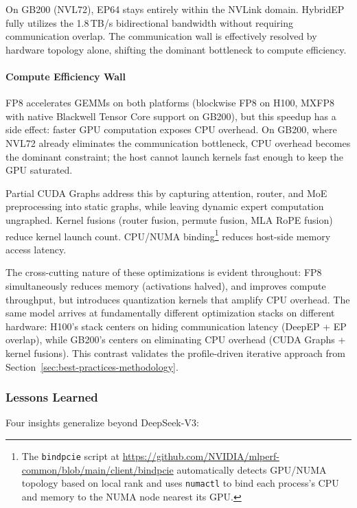 On GB200 (NVL72), EP64 stays entirely within the NVLink domain. HybridEP fully utilizes the 1.8\,TB/s bidirectional bandwidth without requiring communication overlap. The communication wall is effectively resolved by hardware topology alone, shifting the dominant bottleneck to compute efficiency.

\paragraph*{Compute Efficiency Wall}
FP8 accelerates GEMMs on both platforms (blockwise FP8 on H100, MXFP8 with native Blackwell Tensor Core support on GB200), but this speedup has a side effect: faster GPU computation exposes CPU overhead. On GB200, where NVL72 already eliminates the communication bottleneck, CPU overhead becomes the dominant constraint; the host cannot launch kernels fast enough to keep the GPU saturated.

Partial CUDA Graphs address this by capturing attention, router, and MoE preprocessing into static graphs, while leaving dynamic expert computation ungraphed. Kernel fusions (router fusion, permute fusion, MLA RoPE fusion) reduce kernel launch count. CPU/NUMA binding\footnote{The \texttt{bindpcie} script at \url{https://github.com/NVIDIA/mlperf-common/blob/main/client/bindpcie} automatically detects GPU/NUMA topology based on local rank and uses \texttt{numactl} to bind each process's CPU and memory to the NUMA node nearest its GPU.} reduces host-side memory access latency.

\medskip

The cross-cutting nature of these optimizations is evident throughout: FP8 simultaneously reduces memory (activations halved), and improves compute throughput, but introduces quantization kernels that amplify CPU overhead. The same model arrives at fundamentally different optimization stacks on different hardware: H100's stack centers on hiding communication latency (DeepEP + EP overlap), while GB200's centers on eliminating CPU overhead (CUDA Graphs + kernel fusions). This contrast validates the profile-driven iterative approach from Section~\ref{sec:best-practices-methodology}.

\subsubsection{Lessons Learned}

Four insights generalize beyond DeepSeek-V3:

